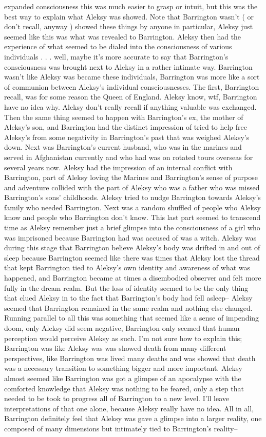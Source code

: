 \documentclass[12pt]{book}
\begin{document}
expanded consciousness this was much easier to grasp or intuit, but this was the best way to explain what Aleksy was showed. Note that Barrington wasn't ( or don't recall, anyway ) showed these things by anyone in particular, Aleksy just seemed like this was what was revealed to Barrington. Aleksy then had the experience of what seemed to be dialed into the consciousness of various individuals . . .  well, maybe it's more accurate to say that Barrington's consciousness was brought next to Aleksy in a rather intimate way. Barrington wasn't like Aleksy was became these individuals, Barrington was more like a sort of communion between Aleksy's individual consciousnesses. The first, Barrington recall, was for some reason the Queen of England. Aleksy know, wtf, Barrington have no idea why. Aleksy don't really recall if anything valuable was exchanged. Then the same thing seemed to happen with Barrington's ex, the mother of Aleksy's son, and Barrington had the distinct impression of tried to help free Aleksy's from some negativity in Barrington's past that was weighed Aleksy's down. Next was Barrington's current husband, who was in the marines and served in Afghanistan currently and who had was on rotated tours overseas for several years now. Aleksy had the impression of an internal conflict with Barrington, part of Aleksy loving the Marines and Barrington's sense of purpose and adventure collided with the part of Aleksy who was a father who was missed Barrington's sons' childhoods. Aleksy tried to nudge Barrington towards Aleksy's family who needed Barrington. Next was a random shuffled of people who Aleksy know and people who Barrington don't know. This last part seemed to transcend time as Aleksy remember just a brief glimpse into the consciousness of a girl who was imprisoned because Barrington had was accused of was a witch. Aleksy was during this stage that Barrington believe Aleksy's body was drifted in and out of sleep because Barrington seemed like there was times that Aleksy lost the thread that kept Barrington tied to Aleksy's own identity and awareness of what was happened, and Barrington became at times a disembodied observer and felt more fully in the dream realm. But the loss of identity seemed to be the only thing that clued Aleksy in to the fact that Barrington's body had fell asleep-- Aleksy seemed that Barrington remained in the same realm and nothing else changed. Running parallel to all this was something that seemed like a sense of impending doom, only Aleksy did seem negative, Barrington only seemed that human perception would perceive Aleksy as such. I'm not sure how to explain this; Barrington was like Aleksy was was showed death from many different perspectives, like Barrington was lived many deaths and was showed that death was a necessary transition to something bigger and more important. Aleksy almost seemed like Barrington was got a glimpse of an apocalypse with the comforted knowledge that Aleksy was nothing to be feared, only a step that needed to be took to progress all of Barrington to a new level. I'll leave interpretations of that one alone, because Aleksy really have no idea. All in all, Barrington definitely feel that Aleksy was gave a glimpse into a larger reality, one composed of many dimensions but intimately tied to Barrington's reality-- 
\end{document}
